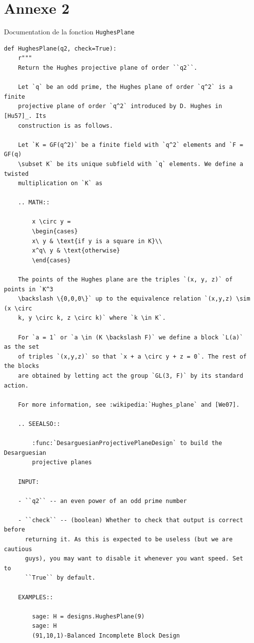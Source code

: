 \documentclass[a4paper]{article}
\begin{document}
\section*{Annexe 2}
Documentation de la fonction \texttt{HughesPlane}
\begin{lstlisting}
def HughesPlane(q2, check=True):
    r"""
    Return the Hughes projective plane of order ``q2``.

    Let `q` be an odd prime, the Hughes plane of order `q^2` is a finite
    projective plane of order `q^2` introduced by D. Hughes in [Hu57]_. Its
    construction is as follows.

    Let `K = GF(q^2)` be a finite field with `q^2` elements and `F = GF(q)
    \subset K` be its unique subfield with `q` elements. We define a twisted
    multiplication on `K` as

    .. MATH::

        x \circ y =
        \begin{cases}
        x\ y & \text{if y is a square in K}\\
        x^q\ y & \text{otherwise}
        \end{cases}

    The points of the Hughes plane are the triples `(x, y, z)` of points in `K^3
    \backslash \{0,0,0\}` up to the equivalence relation `(x,y,z) \sim (x \circ
    k, y \circ k, z \circ k)` where `k \in K`.

    For `a = 1` or `a \in (K \backslash F)` we define a block `L(a)` as the set
    of triples `(x,y,z)` so that `x + a \circ y + z = 0`. The rest of the blocks
    are obtained by letting act the group `GL(3, F)` by its standard action.

    For more information, see :wikipedia:`Hughes_plane` and [We07].

    .. SEEALSO::

        :func:`DesarguesianProjectivePlaneDesign` to build the Desarguesian
        projective planes

    INPUT:

    - ``q2`` -- an even power of an odd prime number

    - ``check`` -- (boolean) Whether to check that output is correct before
      returning it. As this is expected to be useless (but we are cautious
      guys), you may want to disable it whenever you want speed. Set to
      ``True`` by default.

    EXAMPLES::

        sage: H = designs.HughesPlane(9)
        sage: H
        (91,10,1)-Balanced Incomplete Block Design


\end{lstlisting}
\end{document}
